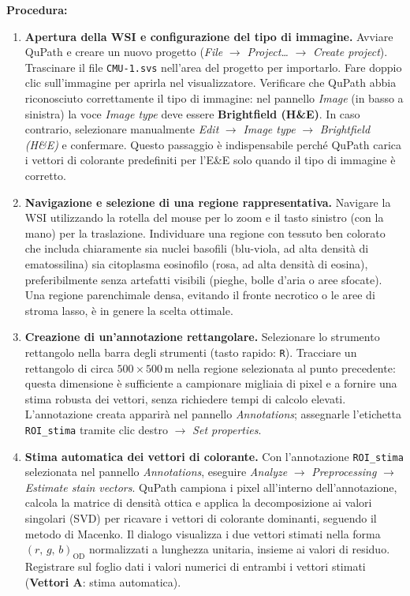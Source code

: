 \bigskip
\textbf{Procedura:}
\begin{enumerate}

    \item \textbf{Apertura della WSI e configurazione del tipo di immagine.}
    Avviare QuPath e creare un nuovo progetto (\textit{File} $\to$ \textit{Project\ldots} $\to$
    \textit{Create project}). Trascinare il file \texttt{CMU-1.svs} nell'area del progetto per
    importarlo. Fare doppio clic sull'immagine per aprirla nel visualizzatore. Verificare che
    QuPath abbia riconosciuto correttamente il tipo di immagine: nel pannello
    \textit{Image} (in basso a sinistra) la voce \textit{Image type} deve essere
    \textbf{Brightfield (H\&E)}. In caso contrario, selezionare manualmente \textit{Edit}
    $\to$ \textit{Image type} $\to$ \textit{Brightfield (H\&E)} e confermare. Questo passaggio
    è indispensabile perché QuPath carica i vettori di colorante predefiniti per l'E\&E solo
    quando il tipo di immagine è corretto.

    \item \textbf{Navigazione e selezione di una regione rappresentativa.}
    Navigare la WSI utilizzando la rotella del mouse per lo zoom e il tasto sinistro (con la
    mano) per la traslazione. Individuare una regione con tessuto ben colorato che includa
    chiaramente sia nuclei basofili (blu-viola, ad alta densità di ematossilina) sia citoplasma
    eosinofilo (rosa, ad alta densità di eosina), preferibilmente senza artefatti visibili
    (pieghe, bolle d'aria o aree sfocate). Una regione parenchimale densa, evitando il fronte
    necrotico o le aree di stroma lasso, è in genere la scelta ottimale.

    \item \textbf{Creazione di un'annotazione rettangolare.}
    Selezionare lo strumento rettangolo nella barra degli strumenti (tasto rapido: \texttt{R}).
    Tracciare un rettangolo di circa $500 \times 500$\,\textmu m nella regione selezionata al
    punto precedente: questa dimensione è sufficiente a campionare migliaia di pixel e a
    fornire una stima robusta dei vettori, senza richiedere tempi di calcolo elevati.
    L'annotazione creata apparirà nel pannello \textit{Annotations}; assegnarle l'etichetta
    \texttt{ROI\_stima} tramite clic destro $\to$ \textit{Set properties}.

    \item \textbf{Stima automatica dei vettori di colorante.}
    Con l'annotazione \texttt{ROI\_stima} selezionata nel pannello \textit{Annotations},
    eseguire \textit{Analyze} $\to$ \textit{Preprocessing} $\to$
    \textit{Estimate stain vectors}. QuPath campiona i pixel all'interno dell'annotazione,
    calcola la matrice di densità ottica e applica la decomposizione ai valori singolari (SVD)
    per ricavare i vettori di colorante dominanti, seguendo il metodo di Macenko. Il dialogo
    visualizza i due vettori stimati nella forma $(r,\,g,\,b)_\text{OD}$ normalizzati a
    lunghezza unitaria, insieme ai valori di residuo. Registrare sul foglio dati i valori
    numerici di entrambi i vettori stimati (\textbf{Vettori A}: stima automatica).


\end{enumerate}
